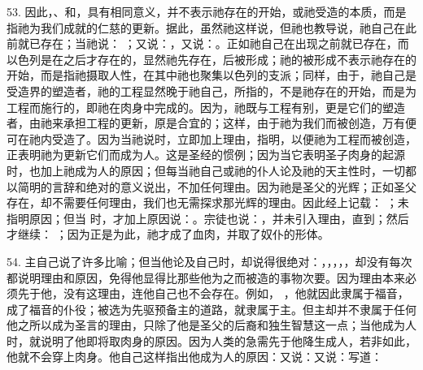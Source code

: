 53. 因此，、和，具有相同意义，并不表示祂存在的开始，或祂受造的本质，而是指祂为我们成就的仁慈的更新。据此，虽然祂这样说，但祂也教导说，祂自己在此前就已存在；当祂说： ；又说：，又说：。正如祂自己在出现之前就已存在，而以色列是在之后才存在的，显然祂先存在，后被形成；祂的被形成不表示祂存在的开始，而是指祂摄取人性，在其中祂也聚集以色列的支派；同样，由于，祂自己是受造界的塑造者，祂的工程显然晚于祂自己，所指的，不是祂存在的开始，而是为工程而施行的，即祂在肉身中完成的。因为，祂既与工程有别，更是它们的塑造者，由祂来承担工程的更新，原是合宜的；这样，由于祂为我们而被创造，万有便可在祂内受造了。因为当祂说时，立即加上理由，指明，以便祂为工程而被创造，正表明祂为更新它们而成为人。这是圣经的惯例；因为当它表明圣子肉身的起源时，也加上祂成为人的原因；但每当祂自己或祂的仆人论及祂的天主性时，一切都以简明的言辞和绝对的意义说出，不加任何理由。因为祂是圣父的光辉；正如圣父存在，却不需要任何理由，我们也无需探求那光辉的理由。因此经上记载： ；未指明原因；但当  时，才加上原因说：。宗徒也说：，并未引入理由，直到；然后才继续： ；因为正是为此，祂才成了血肉，并取了奴仆的形体。\par

54. 主自己说了许多比喻；但当他论及自己时，却说得很绝对：，，，，，却没有每次都说明理由和原因，免得他显得比那些他为之而被造的事物次要。因为理由本来必须先于他，没有这理由，连他自己也不会存在。例如， ，他就因此隶属于福音，成了福音的仆役；被选为先驱预备主的道路，就隶属于主。但主却并不隶属于任何他之所以成为圣言的理由，只除了他是圣父的后裔和独生智慧这一点；当他成为人时，就说明了他即将取肉身的原因。因为人类的急需先于他降生成人，若非如此，他就不会穿上肉身。他自己这样指出他成为人的原因：又说：又说：写道：\par

